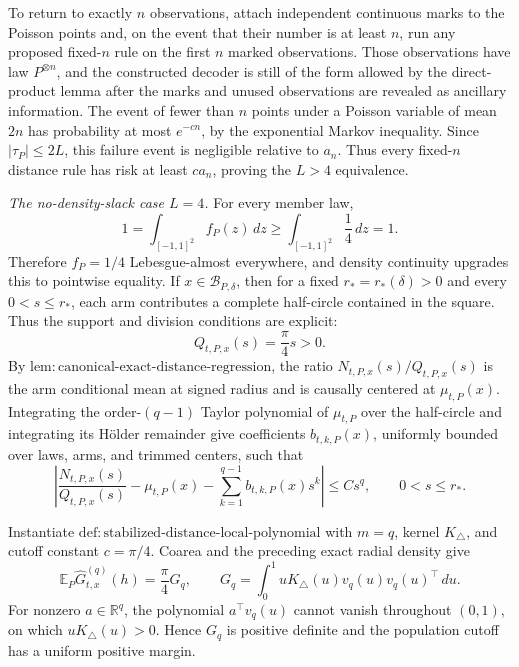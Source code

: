 To return to exactly \(n\) observations, attach independent continuous marks to the Poisson points and, on the event that their number is at least \(n\), run any proposed fixed-\(n\) rule on the first \(n\) marked observations.  Those observations have law \(P^{\otimes n}\), and the constructed decoder is still of the form allowed by the direct-product lemma after the marks and unused observations are revealed as ancillary information.  The event of fewer than \(n\) points under a Poisson variable of mean \(2n\) has probability at most \(e^{-c n}\), by the exponential Markov inequality.  Since \(|\tau_P|\leq2L\), this failure event is negligible relative to \(a_n\).  Thus every fixed-\(n\) distance rule has risk at least \(ca_n\), proving the \(L>4\) equivalence.

\emph{The no-density-slack case \(L=4\).}
For every member law,
\[
 1=\int_{[-1,1]^2}f_P(z)\,dz
 \geq\int_{[-1,1]^2}\frac14\,dz=1.
\]
Therefore \(f_P=1/4\) Lebesgue-almost everywhere, and density continuity upgrades this to pointwise equality.  If \(x\in\mathcal B_{P,\delta}\), then for a fixed \(r_*=r_*(\delta)>0\) and every \(0<s\leq r_*\), each arm contributes a complete half-circle contained in the square.  Thus the support and division conditions are explicit:
\[
 Q_{t,P,x}(s)=\frac\pi4s>0.
\]
By \(\mathrm{lem:canonical\text{-}exact\text{-}distance\text{-}regression}\), the ratio \(N_{t,P,x}(s)/Q_{t,P,x}(s)\) is the arm conditional mean at signed radius and is causally centered at \(\mu_{t,P}(x)\).  Integrating the order-\((q-1)\) Taylor polynomial of \(\mu_{t,P}\) over the half-circle and integrating its H\"older remainder give coefficients \(b_{t,k,P}(x)\), uniformly bounded over laws, arms, and trimmed centers, such that
\[
 \left|\frac{N_{t,P,x}(s)}{Q_{t,P,x}(s)}-\mu_{t,P}(x)
 -\sum_{k=1}^{q-1}b_{t,k,P}(x)s^k\right|
 \leq Cs^q,
 \qquad 0<s\leq r_*.
\]

Instantiate \(\mathrm{def:stabilized\text{-}distance\text{-}local\text{-}polynomial}\) with \(m=q\), kernel \(K_\triangle\), and cutoff constant \(c=\pi/4\).  Coarea and the preceding exact radial density give
\[
 \mathbb E_P\widehat G^{(q)}_{t,x}(h)
 =\frac\pi4G_q,
 \qquad
 G_q=\int_0^1uK_\triangle(u)v_q(u)v_q(u)^\top\,du.
\]
For nonzero \(a\in\mathbb R^q\), the polynomial \(a^\top v_q(u)\) cannot vanish throughout \((0,1)\), on which \(uK_\triangle(u)>0\).  Hence \(G_q\) is positive definite and the population cutoff has a uniform positive margin.

